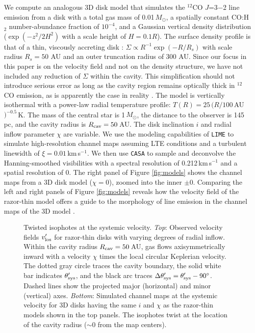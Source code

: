 We compute an analogous 3D disk model that simulates the $^{12}$CO $J$=3$-$2 
line emission from a disk with a total gas mass of 0.01\,$M_\odot$, a spatially 
constant CO:H$_2$ number-abundance fraction of $10^{-4}$, and a Gaussian 
vertical density distribution ($\exp(-z^2/2H^2)$ with a scale height of 
$H=0.1R$).  The surface density profile is that of a thin, viscously accreting 
disk \citep{bellpringle74}: $\Sigma\propto R^{-1}\exp(-R/R_s)$ with scale 
radius $R_s=50$ AU and an outer truncation radius of 300 AU.  Since our focus 
in this paper is on the velocity field and not on the density structure, we 
have not included any reduction of $\Sigma$ within the cavity.  This 
simplification should not introduce serious error as long as the cavity region 
remains optically thick in $^{12}$CO emission, as is apparently the case in 
reality \citep{bruderer13}.  The model is vertically isothermal with a 
power-law radial temperature profile: $T(R) = 25\,(R/100$\,AU$)^{-0.5}$\,K.  
The mass of the central star is 1\,$M_\odot$, the distance to the observer is 
145\,pc, and the cavity radius is $R_{\rm cav} = 50$\,AU.  The disk inclination
$i$ and radial inflow parameter $\chi$ are variable.  We use the modeling 
capabilities of {\tt LIME} \citep{brinch10} to simulate high-resolution channel 
maps assuming LTE conditions and a turbulent linewidth of $\xi = 
0.01$\,km\,s$^{-1}$.  We then use {\tt CASA} to sample and deconvolve the 
Hanning-smoothed visibilities with a spectral resolution of 0.212\,km\,s$^{-1}$ 
and a spatial resolution of 0.  The right panel of Figure 
\ref{fig:models} shows the channel maps from a 3D disk model ($\chi=0$), zoomed 
into the inner $\pm$0.  Comparing the left and right panels of Figure 
\ref{fig:models} reveals how the velocity field of the razor-thin model offers 
a guide to the morphology of line emission in the channel maps of the 3D model 
\citep[see also][]{beckwith93}.

\begin{figure}[t!]
\caption{Twisted isophotes at the systemic velocity. {\it Top}: Observed 
velocity fields $v'_{\rm los}$ for razor-thin disks with varying degrees of 
radial inflow.  Within the cavity radius $R_{\rm cav}=50$\,AU, gas flows 
axisymmetrically inward with a velocity $\chi$ times the local circular 
Keplerian velocity.  The dotted gray circle traces the cavity boundary, the 
solid white bar indicates $\theta'_{\rm sys}$, and the black arc traces $\Delta 
\theta'_{\rm sys} = \theta'_{\rm sys} - 90^\circ$.  Dashed lines show the 
projected major (horizontal) and minor (vertical) axes.  {\it Bottom}: 
Simulated channel maps at the systemic velocity for 3D disks having the same 
$i$ and $\chi$ as the razor-thin models shown in the top panels.  The isophotes 
twist at the location of the cavity radius ($\sim$0 from the map 
centers). \label{fig:thetasys}}
\end{figure}


